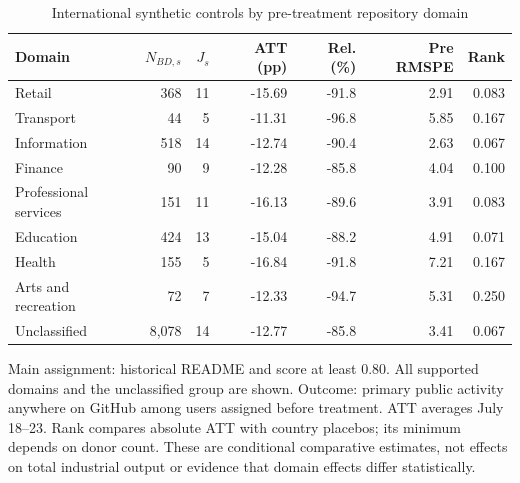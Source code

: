 \begin{table}[htbp]
\centering
\small
\caption{International synthetic controls by pre-treatment repository domain}
\label{tab:sector_sc}
\begin{threeparttable}
\begin{tabular}{@{}p{}rrrrrr@{}}
\toprule
Domain & $N_{BD,s}$ & $J_s$ & ATT (pp) & Rel. (\%) & Pre RMSPE & Rank \\
\midrule
Retail & 368 & 11 & -15.69 & -91.8 & 2.91 & 0.083 \\
Transport & 44 & 5 & -11.31 & -96.8 & 5.85 & 0.167 \\
Information & 518 & 14 & -12.74 & -90.4 & 2.63 & 0.067 \\
Finance & 90 & 9 & -12.28 & -85.8 & 4.04 & 0.100 \\
Professional services & 151 & 11 & -16.13 & -89.6 & 3.91 & 0.083 \\
Education & 424 & 13 & -15.04 & -88.2 & 4.91 & 0.071 \\
Health & 155 & 5 & -16.84 & -91.8 & 7.21 & 0.167 \\
Arts and recreation & 72 & 7 & -12.33 & -94.7 & 5.31 & 0.250 \\
Unclassified & 8,078 & 14 & -12.77 & -85.8 & 3.41 & 0.067 \\
\bottomrule
\end{tabular}
\begin{tablenotes}[flushleft]
\footnotesize
\item Main assignment: historical README and score at least 0.80. All supported domains and the unclassified group are shown. Outcome: primary public activity anywhere on GitHub among users assigned before treatment. ATT averages July 18--23. Rank compares absolute ATT with country placebos; its minimum depends on donor count. These are conditional comparative estimates, not effects on total industrial output or evidence that domain effects differ statistically.
\end{tablenotes}
\end{threeparttable}
\end{table}
